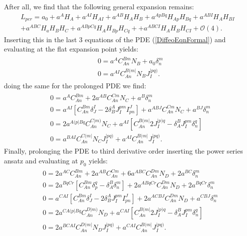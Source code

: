 After all, we find that the following general expansion remains: 
\begin{multline}\label{LperRed}
     L_{per} = a_0 + a^A H_A + a^{AI}H_{AI} + a^{AB} H_{A}H_{B} + a^{ApBq} H_{Ap}H_{Bq} + a^{ABI} H_{A} H_{BI} \\
    + a^{ABC} H_a H_B H_C + a^{ABpCq} H_{A}H_{Bp}H_{Cq} +
    + a^{ABCI} H_A H_B H_{CI} 
    + \mathcal{O}(4).
\end{multline}
Inserting this in the last 3 equations of the PDE (\ref{DiffeoEqnFormal}) and evaluating at the flat expansion point yields:
\begin{align}\label{order1}
    \begin{aligned}
    &0 = a^A C_{An}^{Bm}N_B + a_0 \delta^m_n\\
    &0 = a^{AI}C_{An}^{B(m\vert }N_B J^{\vert pq)}_I.
    \end{aligned}
\end{align}
doing the same for the prolonged PDE we find: 
\begin{align}\label{order2}
    \begin{aligned}
    &0 = a^A C_{An}^{Bm} + 2 a^{AB}C_{An}^{Cm}N_C + a^B\delta^m_n\\
    &0 = a^{AI}\left [C_{An}^{Bm}\delta^I _J- 2 \delta^A_B J_I^{pm}I^J_{pn} \right ] + a^{ABJ}C_{An}^{Cm}N_C + a^{BJ} \delta^m_n \\
    &0 = 2a^{A(p\vert Bq}C_{An}^{C\vert m)}N_C + a^{AI} \left [C_{An}^{B(m\vert} 2 J_{I}^{\vert p)q} - \delta_A^BJ_I^{pm}\delta^q_n \right ]\\
    &0 = a^{BAI}C_{An}^{C(m\vert}N_CJ_I^{\vert pq)} + a^{AI}C_{An}^{B(m \vert} J_I^{\vert pq)}.
    \end{aligned}
\end{align}
Finally, prolonging the PDE to third derivative order inserting the power series ansatz and evaluating at $p_0$ yields:
\begin{align}\label{order3}
\begin{aligned}
&0 = 2 a^{AC}C_{An}^{Bm} + 2a^{AB}C_{An}^{Cm} + 6 a^{ABC}C_{An}^{Dm} N_D + 2a^{BC} \delta^m_n\\
&0 = 2 a^{BqCr} \left [ C_{An}^{Bm} \delta ^q_p - \delta^B_A \delta^m_n \right ] +2 a^{A Bq Cr} C_{An}^{Dm} N_D + 2 a^{BqCr} \delta^m_n\\
&0 = a^{CAI} \left [C_{An}^{Bm}\delta^I _J- 2 \delta^A_B J_I^{pm}I^J_{pn} \right ] + 2 a^{ACBJ} C_{An}^{Dm} N_D + a^{CBJ} \delta ^m _n \\
&0 = 2 a^{C A(p \vert B q} C_{An}^{D \vert m )} N_D + a^{CAI} \left [C_{An}^{B(m\vert} 2 J_{I}^{\vert p)q} - \delta_A^BJ_I^{pm}\delta^q_n \right ]\\
&0 = 2 a^{BCAI}C_{An}^{D(m\vert}N_DJ_I^{\vert pq)} + a^{CAI}C_{An}^{B(m \vert} J_I^{\vert pq)}.
\end{aligned}
\end{align}
